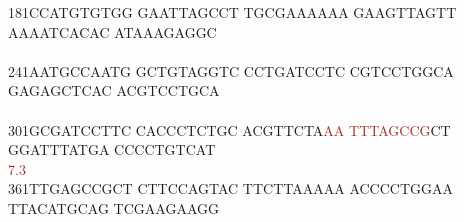 \documentclass[11pt,twoside,reqno,a4paper]{article}
\begin{document}
{181\hspace*{1\charwidth}CCATGTGTGG	GAATTAGCCT	TGCGAAAAAA	GAAGTTAGTT	AAAATCACAC	ATAAAGAGGC	\\
\hspace*{4\charwidth}\hspace*{1\charwidth}\hspace*{1\charwidth}\hspace*{1\charwidth}\hspace*{1\charwidth}\hspace*{1\charwidth}\hspace*{1\charwidth}\\
241\hspace*{1\charwidth}AATGCCAATG	GCTGTAGGTC	CCTGATCCTC	CGTCCTGGCA	GAGAGCTCAC	ACGTCCTGCA	\\
\hspace*{4\charwidth}\hspace*{1\charwidth}\hspace*{1\charwidth}\hspace*{1\charwidth}\hspace*{1\charwidth}\hspace*{1\charwidth}\hspace*{1\charwidth}\\
301\hspace*{1\charwidth}GCGATCCTTC	CACCCTCTGC	ACGTTCTA\textcolor{Brown}{A}\textcolor{Brown}{A}	\textcolor{Brown}{T}\textcolor{Brown}{T}\textcolor{Brown}{T}\textcolor{Brown}{A}\textcolor{Brown}{G}\textcolor{Brown}{C}\textcolor{Brown}{C}\textcolor{Brown}{G}CT	GGATTTATGA	CCCCTGTCAT	\\
\hspace*{4\charwidth}\hspace*{1\charwidth}\hspace*{1\charwidth}\hspace*{28\charwidth}\textcolor{Brown}{7.3}\hspace*{1\charwidth}\hspace*{1\charwidth}\hspace*{1\charwidth}\hspace*{1\charwidth}\\
361\hspace*{1\charwidth}TTGAGCCGCT	CTTCCAGTAC	TTCTTAAAAA	ACCCCTGGAA	TTACATGCAG	TCGAAGAAGG	\\
\hspace*{4\charwidth}\hspace*{1\charwidth}\hspace*{1\charwidth}\hspace*{1\charwidth}\hspace*{1\charwidth}\hspace*{1\charwidth}\hspace*{1\charwidth}\\
}
\end{document}
